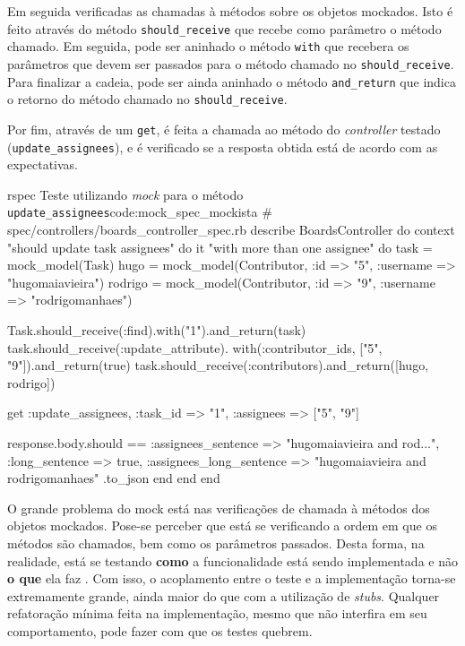 Em seguida verificadas as chamadas à métodos sobre os objetos mockados. Isto é feito através do método \texttt{should\_receive} que recebe como parâmetro o método chamado. Em seguida, pode ser aninhado o método \texttt{with} que recebera os parâmetros que devem ser passados para o método chamado no \texttt{should\_receive}. Para finalizar a cadeia, pode ser ainda aninhado o método \texttt{and\_return} que indica o retorno do método chamado no \texttt{should\_receive}.

Por fim, através de um \texttt{get}, é feita a chamada ao método do \textit{controller} testado (\texttt{update\_assignees}), e é verificado se a resposta obtida está de acordo com as expectativas.

\begin{mycode}{rspec}%
{Teste utilizando \textit{mock} para o método \texttt{update\_assignees}}{code:mock_spec_mockista}
# spec/controllers/boards_controller_spec.rb
describe BoardsController do
  context "should update task assignees" do
    it "with more than one assignee" do
      task = mock_model(Task)
      hugo = mock_model(Contributor, :id => "5", :username => "hugomaiavieira")
      rodrigo = mock_model(Contributor, :id => "9", :username => "rodrigomanhaes")

      Task.should_receive(:find).with("1").and_return(task)
      task.should_receive(:update_attribute).
        with(:contributor_ids, ["5", "9"]).and_return(true)
      task.should_receive(:contributors).and_return([hugo, rodrigo])

      get :update_assignees, :task_id => "1", :assignees => ["5", "9"]

      response.body.should ==
        { :assignees_sentence => "hugomaiavieira and rod...",
          :long_sentence => true,
          :assignees_long_sentence => "hugomaiavieira and rodrigomanhaes" }.to_json
    end
  end
end
\end{mycode}

O grande problema do mock está nas verificações de chamada à métodos dos objetos mockados. Pose-se perceber que está se verificando a ordem em que os métodos são chamados, bem como os parâmetros passados. Desta forma, na realidade, está se testando \textbf{como} a funcionalidade está sendo implementada e não \textbf{o que} ela faz \cite{UnitForAReason}. Com isso, o acoplamento entre o teste e a implementação torna-se extremamente grande, ainda maior do que com a utilização de \textit{stubs}. Qualquer refatoração mínima feita na implementação, mesmo que não interfira em seu comportamento, pode fazer com que os testes quebrem.


